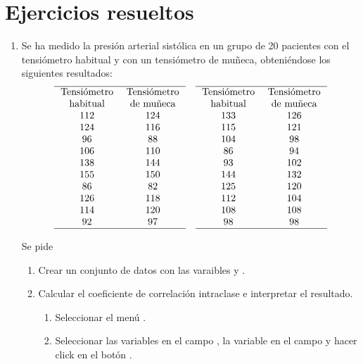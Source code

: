 \section{Ejercicios resueltos}
\begin{enumerate}[leftmargin=*]
\item Se ha medido la presión arterial sistólica en un grupo de 20 pacientes con el tensiómetro habitual y con un
tensiómetro de muñeca, obteniéndose los siguientes resultados:
\[
\begin{array}{cc}
\hline
\multicolumn{1}{p{2cm}}{\centering \text{Tensiómetro} \text{habitual}} & \multicolumn{1}{p{2cm}}{\centering \text{Tensiómetro} \text{de
muñeca}} \\ 
112 & 124 \\ 
124 & 116 \\
 96 &  88 \\
106 & 110 \\
138 & 144 \\
155 & 150 \\
 86 &  82 \\
126 & 118 \\
114 & 120 \\
 92 &  97 \\
\hline
\end{array}
\quad
\begin{array}{cc}
\hline
\multicolumn{1}{p{2cm}}{\centering \text{Tensiómetro} \text{habitual}} & \multicolumn{1}{p{2cm}}{\centering \text{Tensiómetro} \text{de
muñeca}} \\ 
133 & 126 \\
115 & 121 \\
104 &  98 \\
 86 &  94 \\
 93 & 102 \\
144 & 132 \\
125 & 120 \\
112 & 104 \\
108 & 108 \\
 98 &  98 \\
\hline
\end{array}
\]

Se pide
\begin{enumerate}
\item Crear un conjunto de datos con las varaibles  y .

\item Calcular el coeficiente de correlación intraclase e interpretar el resultado.
\begin{indicacion}{
\begin{enumerate}
\item Seleccionar el menú .
\item Seleccionar las variables  en el campo , la
variable en el campo  y hacer click en el botón .
\end{enumerate}

}
\end{indicacion}
\end{enumerate}
\end{enumerate}
